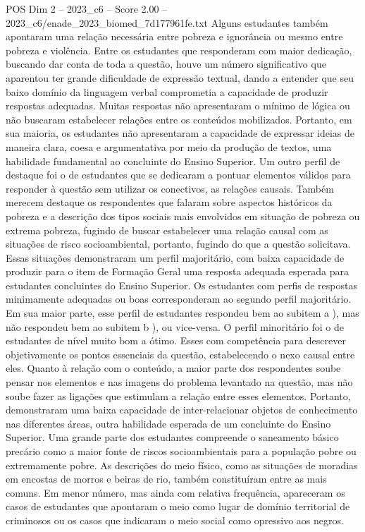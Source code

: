 \begin{textsample}{POS Dim 2 – 2023\_c6 – Score 2.00 – 2023\_c6/enade\_2023\_biomed\_7d177961fe.txt}
Alguns estudantes também apontaram uma relação necessária entre pobreza e ignorância ou mesmo entre pobreza e violência.
Entre os estudantes que responderam com maior dedicação, buscando dar conta de toda a questão, houve um número significativo que aparentou ter grande dificuldade de expressão textual, dando a entender que seu baixo domínio da linguagem verbal comprometia a capacidade de produzir respostas adequadas.
Muitas respostas não apresentaram o mínimo de lógica ou não buscaram estabelecer relações entre os conteúdos mobilizados.
Portanto, em sua maioria, os estudantes não apresentaram a capacidade de expressar ideias de maneira clara, coesa e argumentativa por meio da produção de textos, uma habilidade fundamental ao concluinte do Ensino Superior.
Um outro perfil de destaque foi o de estudantes que se dedicaram a pontuar elementos válidos para responder à questão sem utilizar os conectivos, as relações causais.
Também merecem destaque os respondentes que falaram sobre aspectos históricos da pobreza e a descrição dos tipos sociais mais envolvidos em situação de pobreza ou extrema pobreza, fugindo de buscar estabelecer uma relação causal com as situações de risco socioambiental, portanto, fugindo do que a questão solicitava.
Essas situações demonstraram um perfil majoritário, com baixa capacidade de produzir para o item de Formação Geral uma resposta adequada esperada para estudantes concluintes do Ensino Superior.
Os estudantes com perfis de respostas minimamente adequadas ou boas corresponderam ao segundo perfil majoritário.
Em sua maior parte, esse perfil de estudantes respondeu bem ao subitem a ), mas não respondeu bem ao subitem b ), ou vice-versa.
O perfil minoritário foi o de estudantes de nível muito bom a ótimo.
Esses com competência para descrever objetivamente os pontos essenciais da questão, estabelecendo o nexo causal entre eles.
Quanto à relação com o conteúdo, a maior parte dos respondentes soube pensar nos elementos e nas imagens do problema levantado na questão, mas não soube fazer as ligações que estimulam a relação entre esses elementos.
Portanto, demonstraram uma baixa capacidade de inter-relacionar objetos de conhecimento nas diferentes áreas, outra habilidade esperada de um concluinte do Ensino Superior.
Uma grande parte dos estudantes compreende o saneamento básico precário como a maior fonte de riscos socioambientais para a população pobre ou extremamente pobre.
As descrições do meio físico, como as situações de moradias em encostas de morros e beiras de rio, também constituíram entre as mais comuns.
Em menor número, mas ainda com relativa frequência, apareceram os casos de estudantes que apontaram o meio como lugar de domínio territorial de criminosos ou os casos que indicaram o meio social como opressivo aos negros.

\end{textsample}
